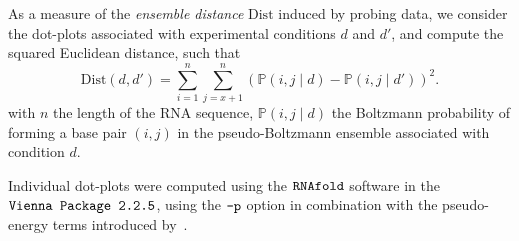 \documentclass[a4,center,fleqn]{NAR}
\newcommand{\Software}[1]{$\text{\ttfamily #1}$}
\newcommand{\Edist }{{ \text{Dist}}}
\newcommand{\RL }{{n}}
\newcommand{\Def}[1]{{\em #1}}
\begin{document}
As a measure of the \Def{ensemble distance} $\Edist$ induced by probing data, we consider the dot-plots associated with experimental conditions $d$ and $d'$, and compute the squared Euclidean distance, such that
\[\Edist (d,d')=\sum\limits_{i=1}^\RL\sum\limits_{j=x+1}^\RL \left(\mathbb{P}(i,j\mid d)-\mathbb{P}(i,j\mid d')\right)^2.\]
with $\RL$ the length of the RNA sequence,  $\mathbb{P}(i,j\mid d)$ the Boltzmann probability of forming a base pair $(i,j)$ in the pseudo-Boltzmann ensemble associated with condition $d$.


Individual dot-plots were computed using the \Software{RNAfold} software in the \Software{Vienna Package 2.2.5}, using the \Software{-p} option in combination with the pseudo-energy terms introduced by~\citet{Deigan2009}. 




\end{document}
